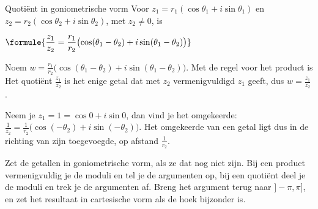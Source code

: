 \begin{theorie}
\begin{stelling}{Quotiënt in goniometrische vorm}
Voor $z_1 = r_1(\cos\theta_1 + i\sin\theta_1)$ en $z_2 = r_2(\cos\theta_2 + i\sin\theta_2)$, met $z_2 \neq 0$, is

\vspace{1mm}
\qquad $\formule{\dfrac{z_1}{z_2} = \dfrac{r_1}{r_2} \bigl(\cos(\theta_1 - \theta_2) + i\sin(\theta_1 - \theta_2)\bigr)}$
\end{stelling}

\begin{bewijs}
Noem $w = \frac{r_1}{r_2}\bigl(\cos(\theta_1 - \theta_2) + i\sin(\theta_1 - \theta_2)\bigr)$. Met de regel voor het product is
Het quotiënt $\frac{z_1}{z_2}$ is het enige getal dat met $z_2$ vermenigvuldigd $z_1$ geeft, dus $w = \frac{z_1}{z_2}$.
\end{bewijs}
\end{theorie}

Neem je $z_1 = 1 = \cos 0 + i\sin 0$, dan vind je het omgekeerde: $\frac{1}{z_2} = \frac{1}{r_2}\bigl(\cos(-\theta_2) + i\sin(-\theta_2)\bigr)$. Het omgekeerde van een getal ligt dus in de richting van zijn toegevoegde, op afstand $\frac{1}{r_2}$.


\begin{werkwijze}
Zet de getallen in goniometrische vorm, als ze dat nog niet zijn. Bij een product vermenigvuldig je de moduli en tel je de argumenten op, bij een quotiënt deel je de moduli en trek je de argumenten af. Breng het argument terug naar $]-\pi, \pi]$, en zet het resultaat in cartesische vorm als de hoek bijzonder is.
\end{werkwijze}

